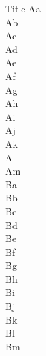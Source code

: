 \documentclass{beamer}
\begin{document}
\begin{frame}[allowframebreaks]{Title}
Aa\\ Ab\\ Ac\\ Ad\\ Ae\\ Af\\ Ag\\ Ah\\ Ai\\ Aj\\ Ak\\ Al\\ Am\\
\framebreak
Ba\\ Bb\\ Bc\\ Bd\\ Be\\ Bf\\ Bg\\\framebreak Bh\\ Bi\\ Bj\\ Bk\\ Bl\\ Bm\\
\end{frame}
\end{document}
